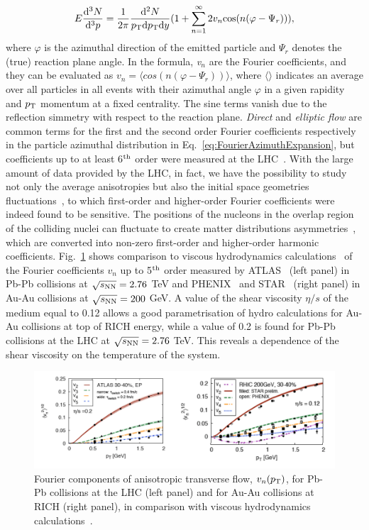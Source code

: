 \begin{equation}
\label{eq:FourierAzimuthExpansion}
E \frac{{\rm d}^3N}{{\rm d}^3p} = \frac{1}{2\pi} \frac{{\rm d}^2N}{p_{\rm T} {\rm d}p_{\rm T} {\rm d}y} (1 + \sum_{n=1}^\infty 2v_n {\rm cos} (n(\varphi - \Psi_r))),
\end{equation}
where $\varphi$ is the azimuthal direction of the emitted particle and 
$\Psi_r$ denotes the (true) reaction plane angle.
In the formula, {\it v$_n$} are the Fourier coefficients, and they can be 
evaluated as $v_n = \langle cos(n(\varphi - \Psi_r)) \rangle$, where 
$\langle \rangle$ indicates an average over all particles in all events with
 their azimuthal angle $\varphi$ in a given rapidity and $p_{\rm T}$ momentum at
  a fixed centrality. The sine terms vanish due to the reflection simmetry 
  with respect to the reaction plane. {\it Direct} and {\it elliptic flow} 
  are common terms for the first and the
second order Fourier coefficients respectively in the particle azimuthal 
distribution in Eq.~\ref{eq:FourierAzimuthExpansion}, but coefficients 
up to at least 6$^{\rm th}$ order were measured at the LHC~\cite{ATLAS:2012at}.
With the large amount of data provided by the LHC, in fact, we have the possibility
to study not only the average anisotropies but also the initial space geometries 
fluctuations~\cite{Aad:2013xma,Schukraft:2012ah}, to which first-order and higher-order Fourier 
coefficients were indeed found to be sensitive. 
The positions of the nucleons in the overlap region of the colliding nuclei 
can fluctuate to create matter distributions asymmetries~\cite{Teaney:2010vd,Alver:2010dn,Alver:2010gr}, which are converted into 
non-zero first-order and higher-order harmonic coefficients. 
Fig.~\ref{fig:vnHydro} shows
   comparison to viscous hydrodynamics calculations~\cite{Gale:2012rq} of the 
   Fourier coefficients $v_n$ up to 5$^{\rm th}$ order measured by ATLAS~\cite{ATLAS:2012at}
    (left panel) in Pb-Pb collisions at $\sqrt{s_{\rm NN}} = 2.76$ TeV and 
    PHENIX~\cite{Adare:2011tg} and STAR~\cite{Pandit:2012mq} 
    (right panel) in Au-Au collisions at $\sqrt{s_{\rm NN}} = 200 $ GeV. A value
     of the shear viscosity $\eta/s$ of the medium equal to 0.12 allows a good parametrisation 
     of hydro calculations for Au-Au collisions at top of RICH energy, while a value of 0.2 is found
      for Pb-Pb collisions at the LHC at $\sqrt{s_{\rm NN}} = 2.76$ TeV.
      This reveals a dependence of the shear viscosity on the temperature of the system.
\begin{figure}[!ht]
  \centering
  \includegraphics[width=15cm]{FigCap1/RICH_ATLAS_vn.png}
  \caption{Fourier components of anisotropic transverse flow, $v_n(p_{\rm T})$, for Pb-Pb collisions at the LHC (left panel) and for Au-Au collisions at RICH (right panel), in comparison with viscous hydrodynamics calculations~\cite{Gale:2012rq}.}
  \label{fig:vnHydro}
\end{figure}
